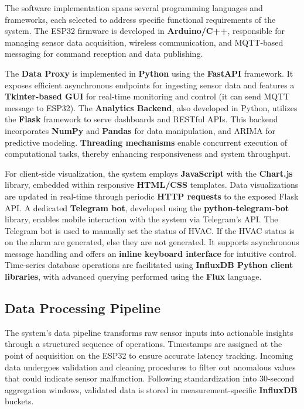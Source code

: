 \documentclass[journal]{IEEEtran}
\begin{document}
The software implementation spans several programming languages and frameworks, each selected to address specific functional requirements of the system. The ESP32 firmware is developed in \textbf{Arduino/C++}, responsible for managing sensor data acquisition, wireless communication, and MQTT-based messaging for command reception and data publishing.

The \textbf{Data Proxy} is implemented in \textbf{Python} using the \textbf{FastAPI} framework. It exposes efficient asynchronous endpoints for ingesting sensor data and features a \textbf{Tkinter-based GUI} for real-time monitoring and control (it can send MQTT message to ESP32). The \textbf{Analytics Backend}, also developed in Python, utilizes the \textbf{Flask} framework to serve dashboards and RESTful APIs. This backend incorporates \textbf{NumPy} and \textbf{Pandas} for data manipulation, and ARIMA for predictive modeling. \textbf{Threading mechanisms} enable concurrent execution of computational tasks, thereby enhancing responsiveness and system throughput.

For client-side visualization, the system employs \textbf{JavaScript} with the \textbf{Chart.js} library, embedded within responsive \textbf{HTML/CSS} templates. Data visualizations are updated in real-time through periodic \textbf{HTTP requests} to the exposed Flask API. A dedicated \textbf{Telegram bot}, developed using the \textbf{python-telegram-bot} library, enables mobile interaction with the system via Telegram's API. The Telegram bot is used to manually set the status of HVAC. If the HVAC status is on the alarm are generated, else they are not generated. It supports asynchronous message handling and offers an \textbf{inline keyboard interface} for intuitive control. Time-series database operations are facilitated using \textbf{InfluxDB Python client libraries}, with advanced querying performed using the \textbf{Flux} language.

\subsection{Data Processing Pipeline}

The system's data pipeline transforms raw sensor inputs into actionable insights through a structured sequence of operations. Timestamps are assigned at the point of acquisition on the ESP32 to ensure accurate latency tracking. Incoming data undergoes validation and cleaning procedures to filter out anomalous values that could indicate sensor malfunction. Following standardization into 30-second aggregation windows, validated data is stored in measurement-specific \textbf{InfluxDB} buckets.
\end{document}
